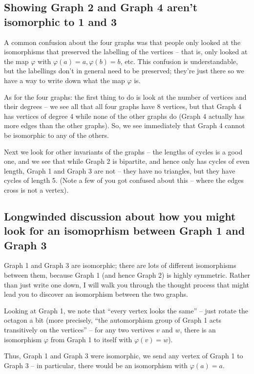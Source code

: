 \documentclass{amsart}
\begin{document}
\subsection*{Showing Graph 2 and Graph 4 aren't isomorphic to 1 and 3}
A common confusion about the four graphs was that people only looked at the isomorphisms that preserved the labelling of the vertices -- that is, only looked at the map $\varphi$ with $\varphi(a)=a, \varphi(b)=b$, etc.  This confusion is understandable, but the labellings don't in general need to be preserved; they're just there so we have a way to write down what the map $\varphi$ is.

    As for the four graphs: the first thing to do is look at the number of vertices and their degrees -- we see all that all four graphs have 8 vertices, but that Graph 4 has vertices of degree 4 while none of the other graphs do (Graph 4 actually has more edges than the other graphs).  So, we see immediately that Graph 4 cannot be isomorphic to any of the others.

    Next we look for other invariants of the graphs -- the lengths of cycles is a good one, and we see that while Graph 2 is bipartite, and hence only has cycles of even length, Graph 1 and Graph 3 are not -- they have no triangles, but they have cycles of length 5.  (Note a few of you got confused about this -- where the edges cross is not a vertex).


\subsection*{Longwinded discussion about how you might look for an isomoprhism between Graph 1 and Graph 3}    
    Graph 1 and Graph 3 are isomorphic; there are lots of different isomorphisms between them, because Graph 1 (and hence Graph 2) is highly symmetric.  Rather than just write one down, I will walk you through the thought process that might lead you to discover an isomorphism between the two graphs.

    Looking at Graph 1, we note that ``every vertex looks the same'' -- just rotate the octagon a bit (more precisely, ``the automorphism group of Graph 1 acts transitively on the vertices'' -- for any two vertives $v$ and $w$, there is an isomorphism $\varphi$ from Graph 1 to itself with $\varphi(v)=w$).

    Thus, Graph 1 and Graph 3 were isomorphic, we send any vertex of Graph 1 to Graph 3 -- in particular, there would be an isomorphism with $\varphi(a)=a$.
\end{document}
